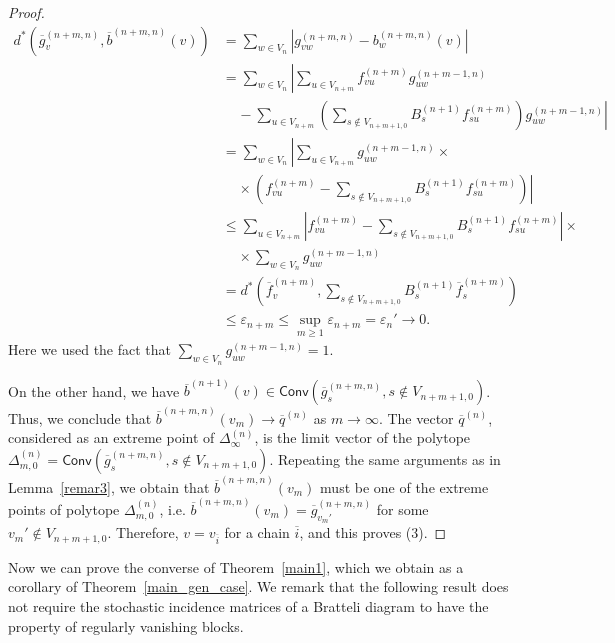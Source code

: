 \documentclass[11pt, english, reqno]{amsart}
\theoremstyle{definition}
\theoremstyle{remark}
\theoremstyle{plain}
\def\ov{\overline}
\numberwithin{equation}{section}
\begin{document}
{\begin{proof}
$$
\begin{aligned}
d^*(\ov g_v^{(n+m,n)}, \ov b^{(n+m,n)}(v)) & = \sum_{w \in V_n}
| g_{vw}^{(n+m,n)} - b_{w}^{(n+m,n)}(v) | \\
& = \left. \sum_{w \in V_n} \right|\sum_{u \in V_{n+m}} f_{vu}^{(n+m)}
g_{uw}^{(n +m-1,n)} \\
& \ \ \ \ \ - \left.\sum_{u \in V_{n+m}}\left(\sum_{s \notin V_{n+m+1,0}}
 B_s^{(n+1)} f_{su}^{(n+m)}\right)g_{uw}^{(n+m-1,n)} \right|\\
 & = \left.\sum_{w \in V_n} \right|\sum_{u \in V_{n+m}}
 g_{uw}^{(n+m-1,n)}\times \\
 & \ \ \ \ \ \times \left(f_{vu}^{(n+m)}
  - \left.\sum_{s \notin V_{n+m+1,0}}B_s^{(n+1)} f_{su}^{(n+m)}\right)
  \right|\\
 & \leq  \left.\sum_{u \in V_{n+m}} \right|f_{vu}^{(n+m)} -
 \left.\sum_{s \notin V_{n+m
 +1,0}} B_s^{(n+1)} f_{su}^{(n+m)}\right| \times \\
 &\ \ \ \ \ \times \sum_{w \in V_n} g_{uw}^{(n+m-1,n)} \\
 & =  d^*(\ov f_v^{(n+m)}, \sum_{s \notin V_{n+m+1,0}}B_s^{(n+1)}
 \ov f_{s}^{(n+m)}) \\
 &\leq \varepsilon_{n+m} \leq \sup_{m \geq 1}\varepsilon_{n+m} =
 \varepsilon_n' \rightarrow 0.
\end{aligned}
$$
Here we used the fact that $\sum_{w \in V_n}g_{uw}^{(n+m-1,n)} = 1$.

On the other hand, we have $\ov b^{(n+1)}(v) \in \mathsf{Conv}(\ov
g_s^{(n+m,n)}, s \notin V_{n+m+1,0})$. Thus, we conclude that
 $\ov b^{(n+m,n)}
(v_m) \rightarrow \ov q^{(n)}$ as $m \rightarrow \infty$. The vector $\ov
q^{(n)}$, considered as  an extreme point of $\Delta_{\infty}^{(n)}$, is the limit
 vector of the
polytope $\Delta_{m,0}^{(n)} = \mathsf{Conv}(\ov g_s^{(n+m,n)}, s \notin
V_{n+m+1,0})$. Repeating the same arguments as in Lemma~\ref{remar3},
we obtain that $\ov b^{(n+m,n)}(v_m)$ must be one of the extreme points of
polytope $\Delta_{m,0}^{(n)}$, i.e. $\ov b^{(n+m,n)}(v_m) =
\ov g_{v_m'}^{(n+m,n)}$ for some $v_m' \notin V_{n+m+1,0}$. Therefore,
$v = v_{\ov i}$ for a chain $\ov i$, and this proves (3).
\end{proof}


Now we can prove the converse of Theorem~\ref{main1}, which we 
 obtain as a corollary of Theorem~\ref{main_gen_case}. 
We remark that the following result does not require the stochastic incidence matrices of a Bratteli diagram to have the property of regularly vanishing blocks.

}
\end{document}
